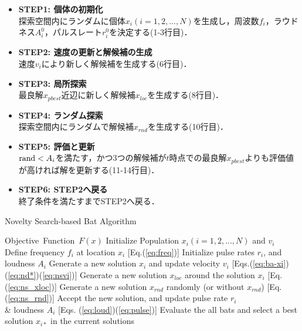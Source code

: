 \documentclass[a4j,11pt]{jarticle}
\begin{document}
\begin{itemize}
\item {\bf STEP1: 個体の初期化}\\
探索空間内にランダムに個体$x_i (i=1,2,...,N)$を生成し，周波数$f_i$，ラウドネス$A_i^0$，パルスレート$r_i^0$を決定する(1-3行目)．
\item {\bf STEP2: 速度の更新と解候補の生成}\\
速度$v_i$により新しく解候補を生成する(6行目)．
\item {\bf STEP3: 局所探索}\\
最良解$x_{pbest}$近辺に新しく解候補$x_{loc}$を生成する(8行目)．
\item {\bf STEP4: ランダム探索}\\
探索空間内にランダムで解候補$x_{rnd}$を生成する(10行目)．
\item {\bf STEP5: 評価と更新}\\
${\rm rand} < A_i$を満たす，かつ3つの解候補が$t$時点での最良解$x_{pbest}$よりも評価値が高ければ解を更新する(11-14行目)．
\item {\bf STEP6: STEP2へ戻る}\\
終了条件を満たすまでSTEP2へ戻る．
\end{itemize}

\begin{algorithm}[H]
\caption{Novelty Search-based Bat Algorithm}
\label{code:nsba}
\begin{algorithmic}[6]
\REQUIRE Objective\ Function\ $F(x)$
\STATE Initialize Population $x_i(i=1,2,..., N)$ and $v_i$\\
\STATE Define frequency $f_i$ at location $x_i$ [Eq.(\ref{eq:freq})]
\STATE Initialize pulse rates $r_i$, and loudness $A_i$
\STATE Generate a new solution $x_i$ and update velocity $v_i$  [Eqs.(\ref{eq:ba-xi})(\ref{eq:nd*})(\ref{eq:nsvi})] 
\STATE Generate a new solution ${x_{loc}}$ around the solution $x_{i}$ [Eq.(\ref{eq:ns_xloc})] 
\ENDIF
\STATE Generate a new solution $x_{rnd}$ randomly (or without ${x_{rnd}}$) [Eq. (\ref{eq:ns_rnd})]
\STATE Accept the new solution, and update pulse rate $r_i$ \\ \& loudness $A_i$ [Eqs. (\ref{eq:loud})(\ref{eq:pulse})] 
\ENDIF
\ENDFOR
\STATE Evaluate the all bats and select a best solution $x_{i*}$ in the current solutions
\ENDWHILE
\end{algorithmic}
\end{algorithm}
\end{document}

